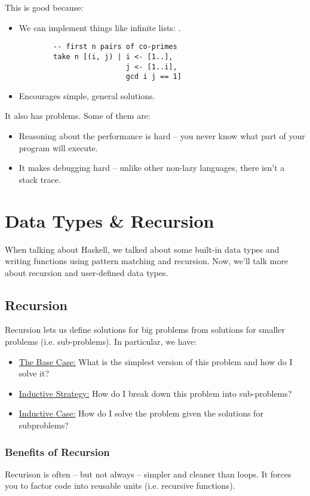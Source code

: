 \documentclass[letterpaper]{article}
\begin{document}
\bigskip 

This is good because: 
\begin{itemize}
    \item We can implement things like infinite lists: \code{[1..]}. 
    \begin{verbatim}
        -- first n pairs of co-primes 
        take n [(i, j) | i <- [1..],
                         j <- [1..i],
                         gcd i j == 1]\end{verbatim}
        
    \item Encourages simple, general solutions.
\end{itemize}
It also has problems. Some of them are: 
\begin{itemize}
    \item Reasoning about the performance is hard -- you never know what part of your program will execute.
    \item It makes debugging hard -- unlike other non-lazy languages, there isn't a stack trace. 
\end{itemize}




\newpage 
\section{Data Types \& Recursion}
When talking about Haskell, we talked about some built-in data types and writing functions using pattern matching and recursion. Now, we'll talk more about recursion and user-defined data types. 

\subsection{Recursion}
Recursion lets us define solutions for big problems from solutions for smaller problems (i.e. sub-problems). In particular, we have: 
\begin{itemize}
    \item \underline{The Base Case:} What is the simplest version of this problem and how do I solve it? 
    \item \underline{Inductive Strategy:} How do I break down this problem into sub-problems? 
    \item \underline{Inductive Case:} How do I solve the problem given the solutions for subproblems? 
\end{itemize}

\subsubsection{Benefits of Recursion}
Recurison is often -- but not always -- simpler and cleaner than loops. It forces you to factor code into reusable units (i.e. recursive functions).
\end{document}
